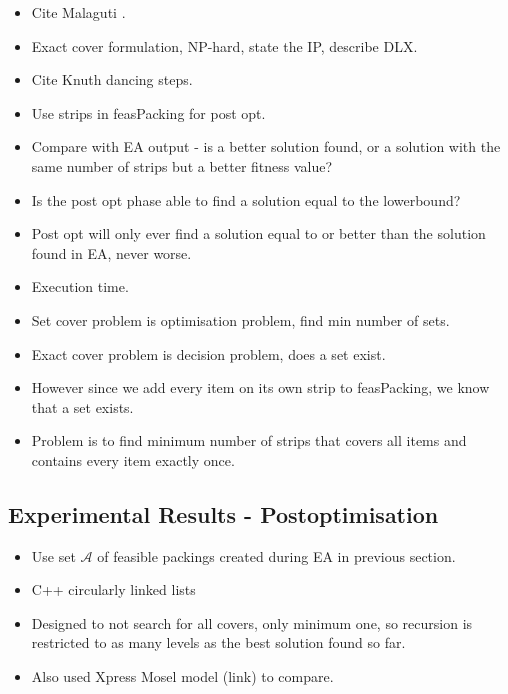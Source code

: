 \documentclass{elsarticle}
\begin{document}
{\color{myGreen}
\begin{itemize}[leftmargin=*]
	\item Cite Malaguti \cite{malaguti2008}.
	\item Exact cover formulation, NP-hard, state the IP, describe DLX.
	\item Cite Knuth \cite{knuth2000} dancing steps.
	\item Use strips in feasPacking for post opt.
	\item Compare with EA output - is a better solution found, or a solution with the same number of strips but a better fitness value?
	\item Is the post opt phase able to find a solution equal to the lowerbound?
	\item Post opt will only ever find a solution equal to or better than the solution found in EA, never worse.
	\item Execution time.
	\item Set cover problem is optimisation problem, find min number of sets.
	\item Exact cover problem is decision problem, does a set exist.
	\item However since we add every item on its own strip to feasPacking, we know that a set exists.
	\item Problem is to find minimum number of strips that covers all items and contains every item exactly once.
\end{itemize}
}

\subsection{Experimental Results - Postoptimisation}
\label{sub:exppostopt}
{\color{myGreen}
\begin{itemize}[leftmargin=*]
	\item Use set $\mathcal{A}$ of feasible packings created during EA in previous section.
	\item C++ circularly linked lists
	\item Designed to not search for all covers, only minimum one, so recursion is restricted to as many levels as the best solution found so far.
	\item Also used Xpress Mosel model (link) to compare.
\end{itemize}
}
\end{document}
